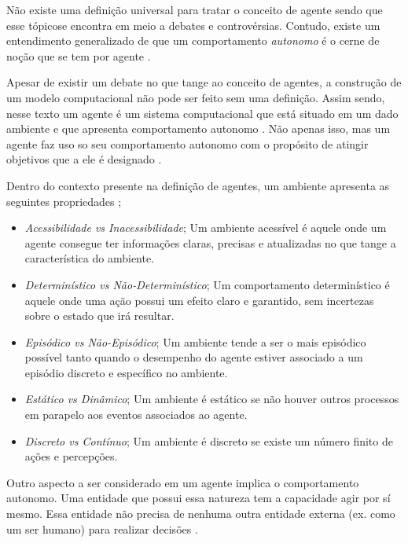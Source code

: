 Não existe uma definição universal para tratar o conceito de agente sendo que esse tópicose encontra em meio a debates e controvérsias. Contudo, existe um entendimento generalizado de que 
um comportamento \textit{autonomo} é o cerne de noção que se tem por agente \cite{whatisagent}. 

Apesar de existir um debate no que tange ao conceito de agentes, a construção de um modelo computacional não pode ser feito sem uma definição. Assim sendo, nesse texto um agente é
 um sistema computacional que está situado em um dado ambiente e que apresenta comportamento autonomo \cite{definitionagent} \cite{whatisagent}. Não apenas isso, mas um agente faz uso
 so seu comportamento autonomo com o propósito de atingir objetivos que a ele é designado \cite{definitionagent} \cite{whatisagent}.

Dentro do contexto presente na definição de agentes, um ambiente apresenta as seguintes propriedades \cite{artificialinteligencemodermapproach} \cite{whatisagent}; 
\begin{itemize}
    \item \textit{Acessibilidade vs Inacessibilidade}; Um ambiente acessível é aquele onde um agente consegue ter informações claras, precisas e atualizadas no que tange a característica do ambiente.
    \item \textit{Determinístico vs Não-Determinístico}; Um comportamento determinístico é aquele onde uma ação possui um efeito claro e garantido, sem incertezas sobre o estado que irá resultar.
    \item \textit{Episódico vs Não-Episódico}; Um ambiente tende a ser o mais episódico possível tanto quando o desempenho do agente estiver associado a um episódio discreto e específico no ambiente.
    \item \textit{Estático vs Dinâmico}; Um ambiente é estático se não houver outros processos em parapelo aos eventos associados ao agente.
    \item \textit{Discreto vs Contínuo}; Um ambiente é discreto se existe um número finito de ações e percepções. 
\end{itemize}


Outro aspecto a ser considerado em um agente implica o comportamento autonomo. Uma entidade que possui essa natureza tem a capacidade agir por sí mesmo. Essa entidade não precisa de nenhuma outra entidade externa (ex. como um ser humano)
para realizar decisões \cite{whatisagent} \cite{definitionagent}. 
